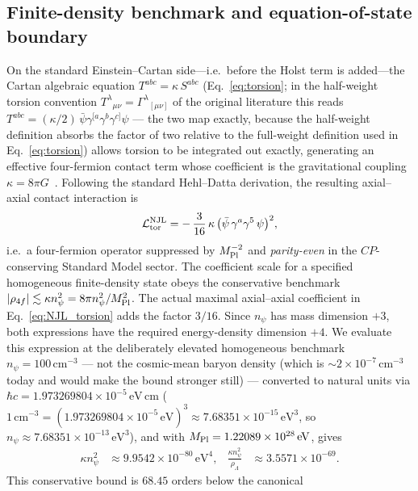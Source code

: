 \documentclass[aps,prd,twocolumn,superscriptaddress,showpacs,preprintnumbers,nofootinbib,longbibliography,floatfix]{revtex4-2}
\newcommand{\MPl}{M_{\rm Pl}}
\begin{document}
\subsection{Finite-density benchmark and equation-of-state boundary}
\label{sec:r1_njl}
On the standard Einstein--Cartan side---i.e.\ before the Holst term is
added---the Cartan algebraic equation $T^{abc} = \kappa\,S^{abc}$
(Eq.~\eqref{eq:torsion}; in the half-weight torsion convention
$T^\lambda{}_{\mu\nu} = \Gamma^\lambda{}_{[\mu\nu]}$ of the original
literature this reads $T^{abc} = (\kappa/2)\,
\bar\psi \gamma^{[a}\gamma^b\gamma^{c]} \psi$ --- the two map exactly,
because the half-weight definition absorbs the factor of two relative to the
full-weight definition used in Eq.~\eqref{eq:torsion}) allows torsion to
be integrated out exactly, generating an effective four-fermion
contact term whose coefficient is the gravitational coupling
$\kappa = 8\pi G$~\cite{Hehl1976,HehlDattaNJL1971}. Following the standard
Hehl--Datta derivation, the resulting axial--axial contact interaction is
\begin{equation}
\mathcal{L}^{\rm NJL}_{\rm tor}
= -\,\frac{3}{16}\,\kappa\,\bigl(\bar\psi\,\gamma^a\gamma^5\,\psi\bigr)^2,
\label{eq:NJL_torsion}
\end{equation}
i.e.\ a four-fermion operator suppressed by $M_{\rm Pl}^{-2}$ and
\emph{parity-even} in the $C\!P$-conserving Standard Model sector. The
coefficient scale for a specified homogeneous finite-density state obeys the
conservative benchmark
$|\rho_{4f}|\lesssim\kappa n_\psi^2=8\pi n_\psi^2/M_{\rm Pl}^2$.
The actual maximal axial--axial coefficient in Eq.~\eqref{eq:NJL_torsion}
adds the factor $3/16$.  Since $n_\psi$ has mass dimension $+3$, both
expressions have the required energy-density dimension $+4$.
We evaluate this expression at the deliberately elevated homogeneous benchmark
$n_\psi=100\,\text{cm}^{-3}$ --- not the
cosmic-mean baryon density (which is $\sim\!2\times 10^{-7}\,\text{cm}^{-3}$
today and would make the bound stronger still) --- converted to
natural units via $\hbar c = 1.973269804\times 10^{-5}\,\text{eV}\,\text{cm}$
($1\,\text{cm}^{-3} = (1.973269804\times 10^{-5}\,\text{eV})^3
\approx 7.68351\times10^{-15}\,\text{eV}^3$, so
$n_\psi\approx 7.68351\times10^{-13}\,\text{eV}^3$), and with
$\MPl=1.22089\times10^{28}\,\text{eV}$, gives
\begin{align}
\kappa n_\psi^2 &\approx 9.9542\times10^{-80}\,\text{eV}^4,
&\frac{\kappa n_\psi^2}{\rho_\Lambda}&\approx3.5571\times10^{-69}.
\end{align}
This conservative bound is $68.45$ orders below the canonical
\end{document}
